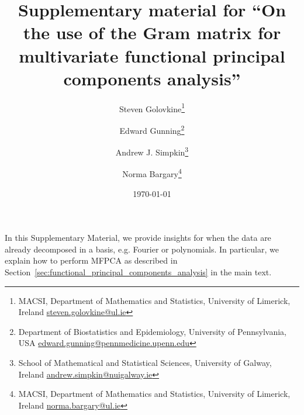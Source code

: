 \documentclass[11pt, oneside]{article}
\title{Supplementary material for ``On the use of the Gram matrix for multivariate functional principal components analysis''}
\author{%
Steven Golovkine\thanks{MACSI, Department of Mathematics and Statistics, University of Limerick, Ireland \href{mailto:steven.golovkine@ul.ie}{steven.golovkine@ul.ie}}
\and
Edward Gunning\thanks{Department of Biostatistics and Epidemiology, University of Pennsylvania, USA \href{mailto:edward.gunning@pennmedicine.upenn.edu}{edward.gunning@pennmedicine.upenn.edu}}
\and
Andrew J. Simpkin\thanks{School of Mathematical and Statistical Sciences, University of Galway, Ireland \href{mailto:andrew.simpkin@nuigalway.ie}{andrew.simpkin@nuigalway.ie}}
\and
Norma Bargary\thanks{MACSI, Department of Mathematics and Statistics, University of Limerick, Ireland \href{mailto:norma.bargary@ul.ie}{norma.bargary@ul.ie}}
}
\date{\today}
\newcounter{th}
\begin{document}
\maketitle

In this Supplementary Material, we provide insights for when the data are already decomposed in a basis, e.g. Fourier or polynomials. In particular, we explain how to perform MFPCA as described in Section~\ref{sec:functional_principal_components_analysis} in the main text.

\renewcommand{\theequation}{SM.\arabic{equation}}









\makeatletter{}\makeatother
\end{document}
